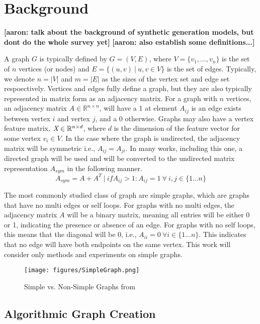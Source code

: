 \documentclass{article}
\newcommand{\aaron}[2]{{\color{orange}\bfseries [aaron: #1]}}
\begin{document}
\section{Background}
\label{background}

\aaron{talk about the background of synthetic generation models, but dont do the whole survey yet}{}
\aaron{also establish some definitions...}{}

A graph $G$ is typically defined by $G = (V, E)$, where $V=\{v_1, ..., v_n\}$ is the set of $n$ vertices (or nodes) and $E=\{(u, v)\ |\ u, v \in V\}$ is the set of edges. Typically, we denote $n = |V|$ and $m = |E|$ as the sizes of the vertex set and edge set respoectively. Vertices and edges fully define a graph, but they are also typically represented in matrix form as an adjacency matrix. For a graph with $n$ vertices, an adjacency matrix $A \in\mathbb{R}^{n\times n}$, will have a 1 at element $A_{ij}$ is an edge exists between vertex $i$ and vertex $j$, and a 0 otherwise. Graphs may also have a vertex feature matrix, $\emph{X} \in \mathbb{R}^{n\times d}$, where $d$ is the dimension of the feature vector for some vertex $v_i \in V$. In the case where the graph is undirected, the adjacency matrix will be symmetric i.e., $A_{ij} = A_{ji}$. In many works, including this one, a directed graph will be used and will be converted to the undirected  matrix representation $A_{sym}$ in the following manner. 
\[
A_{sym} = A + A^T\ |\ if A_{ij} > 1: A_{ij} = 1\ \forall\ i,j \in \{1...n\}
\]

The most commonly studied class of graph are simple graphs, which are graphs that have no multi edges or self loops. For graphs with no multi edges, the adjacency matrix $A$ will be a binary matrix, meaning all entries will be either 0 or 1, indicating the presence or absence of an edge. For graphs with no self loops, this means that the diagonal will be 0, i.e., $A_{ii}=0\ \forall i \in \{1...n\}$. This indicates that no edge will have both endpoints on the same vertex. This work will consider only methods and experiments on simple graphs.

\begin{figure}[h]
\centering
\texttt{[image: figures/SimpleGraph.png]}
\caption{Simple vs. Non-Simple Graphs from \cite{simplegraphweisstein}}
\label{SimpleGraph}
\end{figure}

\subsection{Algorithmic Graph Creation}
\end{document}
